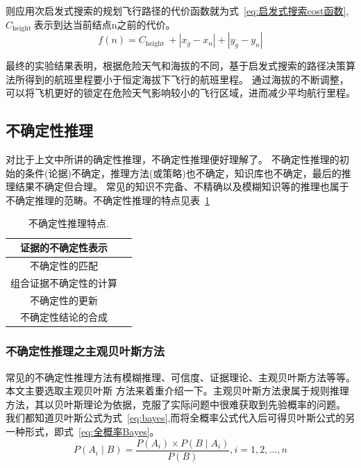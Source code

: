 \documentclass[12pt,a4paper,UTF8]{ctexart}
\begin{document}
则应用次启发式搜索的规划飞行路径的代价函数就为式~\ref{eq:启发式搜索cost函数},$ C_{\text {height }} $表示到达当前结点n之前的代价。
\begin{equation}
    f(n)=C_{\text {height }}+\left|x_g-x_n\right|+\left|y_g-y_n\right|
    \label{eq:启发式搜索cost函数}
\end{equation}

最终的实验结果表明，根据危险天气和海拔的不同，基于启发式搜索的路径决策算法所得到的航班里程要小于恒定海拔下飞行的航班里程。
通过海拔的不断调整，可以将飞机更好的锁定在危险天气影响较小的飞行区域，进而减少平均航行里程\cite{hePathPlanningMethod2019}。

\subsection{不确定性推理}
对比于上文中所讲的确定性推理，不确定性推理便好理解了。
不确定性推理的初始的条件(论据)不确定，推理方法(或策略)也不确定，知识库也不确定，最后的推理结果不确定但合理。
常见的知识不完备、不精确以及模糊知识等的推理也属于不确定推理的范畴。不确定性推理的特点见表~\ref{table:bqdx特点}
\begin{table}[htb]
    \centering
    \caption{不确定性推理特点.}
    \label{table:bqdx特点}
    \begin{tabular}{@{}cc@{}}
    \toprule
    证据的不确定性表示                       \\ \hline
    不确定性的匹配                         \\ \hline
    \multicolumn{1}{l}{组合证据不确定性的计算} \\ \hline
    不确定性的更新                         \\ \hline
    不确定性结论的合成                       \\ \hline
    \toprule
    \end{tabular}
\end{table}
\subsubsection{不确定性推理之主观贝叶斯方法}
常见的不确定性推理方法有模糊推理、可信度、证据理论、主观贝叶斯方法等等。本文主要选取主观贝叶斯
方法来着重介绍一下。主观贝叶斯方法隶属于规则推理方法，其以贝叶斯理论为依据，克服了实际问题中很难获取到先验概率的问题\cite{gonenComparingObjectiveSubjective2019}\cite{uzunogluAdaptiveBayesianApproach2020a}。
我们都知道贝叶斯公式为式~\ref{eq:bayes},而将全概率公式代入后可得贝叶斯公式的另一种形式，即式~\ref{eq:全概率Bayes}。
\begin{equation}
    P\left(A_i \mid B\right)=\frac{P\left(A_i\right) \times P\left(B \mid A_i\right)}{P(B)}, i=1,2, \ldots, n
    \label{eq:bayes}
\end{equation}
\end{document}
